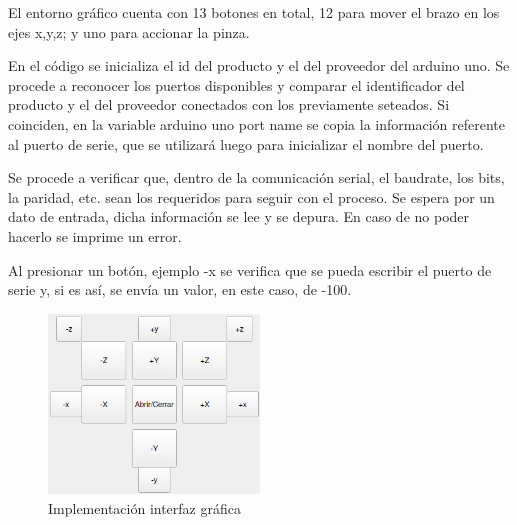 El entorno gráfico cuenta con 13 botones en total, 12 para mover el brazo en los ejes x,y,z; y uno para accionar la pinza.
\par
En el código se inicializa el id del producto y el del proveedor del arduino uno. Se procede a reconocer los puertos disponibles y comparar el identificador del producto y el del proveedor conectados con los previamente seteados. Si coinciden, en la variable arduino uno port name se copia la información referente al puerto de serie, que se utilizará luego para inicializar el nombre del puerto. 
\par
Se procede a verificar que, dentro de la comunicación serial, el baudrate, los bits, la paridad, etc. sean los requeridos para seguir con el proceso. Se espera por un dato de entrada, dicha información se lee y se depura. En caso de no poder hacerlo se imprime un error. 
\par
Al presionar un botón, ejemplo -x se verifica que se pueda escribir el puerto de serie y, si es así, se envía un valor, en este caso, de -100.
\begin{figure}[!htb]
  \begin{center}
    \includegraphics[width=0.5\textwidth]{imagenes/GUIscreenShot.png}
  \end{center}
  \caption{Implementación interfaz gráfica}
  \label{fig:GUI}
\end{figure}
\FloatBarrier

